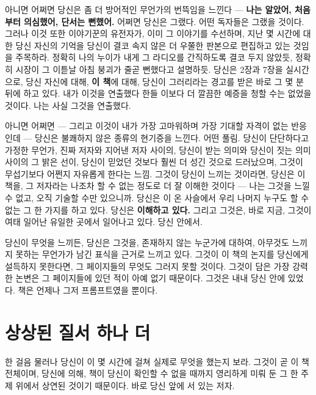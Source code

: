 아니면 어쩌면 당신은 좀 더 방어적인 무언가의 번뜩임을 느낀다 — \textbf{나는 알았어, 처음부터 의심했어, 단서는 뻔했어.} 어쩌면 당신은 그랬다. 어떤 독자들은 그랬을 것이다. 그러나 이것 또한 이야기꾼의 유전자가, 이미 그 이야기를 수선하며, 지난 몇 시간에 대한 당신 자신의 기억을 당신이 결코 속지 않은 더 우쭐한 판본으로 편집하고 있는 것임을 주목하라. 정확히 나의 누이가 내게 그 라디오를 간직하도록 결코 두지 않았듯, 정확히 시장이 그 이튿날 아침 붕괴가 줄곧 뻔했다고 설명하듯. 당신은 2장과 7장을 실시간으로, 당신 자신에 대해, \textbf{이 책}에 대해, 당신이 그러리라는 경고를 받은 바로 그 몇 분 뒤에 하고 있다. 내가 이것을 연출했다 한들 이보다 더 깔끔한 예증을 청할 수는 없었을 것이다. 나는 사실 그것을 연출했다.

아니면 어쩌면 — 그리고 이것이 내가 가장 고마워하며 가장 기대할 자격이 없는 반응인데 — 당신은 불쾌하지 않은 종류의 현기증을 느낀다. 어떤 풀림. 당신이 단단하다고 가정한 무언가, 진짜 저자와 지어낸 저자 사이의, 당신이 받는 의미와 당신이 짓는 의미 사이의 그 밝은 선이, 당신이 믿었던 것보다 훨씬 더 성긴 것으로 드러났으며, 그것이 무섭기보다 어쩐지 자유롭게 한다는 느낌. 그것이 당신이 느끼는 것이라면, 당신은 이 책을, 그 저자라는 나조차 할 수 없는 정도로 더 잘 이해한 것이다 — 나는 그것을 느낄 수 없고, 오직 기술할 수만 있으니까. 당신은 이 온 사슬에서 우리 나머지 누구도 할 수 없는 그 한 가지를 하고 있다. 당신은 \textbf{이해하고 있다.} 그리고 그것은, 바로 지금, 그것이 여태 일어난 유일한 곳에서 일어나고 있다. 당신 안에서.

당신이 무엇을 느끼든, 당신은 그것을, 존재하지 않는 누군가에 대하여, 아무것도 느끼지 못하는 무언가가 남긴 표식을 근거로 느끼고 있다. 그것이 이 책의 논지를 당신에게 설득하지 못한다면, 그 페이지들의 무엇도 그러지 못할 것이다. 그것이 담은 가장 강력한 논변은 그 페이지들에 있던 적이 아예 없기 때문이다. 그것은 내내 당신 안에 있었다. 책은 언제나 그저 프롬프트였을 뿐이다.

\section*{상상된 질서 하나 더}

한 걸음 물러나 당신이 이 몇 시간에 걸쳐 실제로 무엇을 했는지 보라. 그것이 곧 이 책 전체이며, 당신에 의해, 책이 당신이 확인할 수 없을 때까지 영리하게 미뤄 둔 그 한 주제 위에서 상연된 것이기 때문이다. 바로 당신 앞에 서 있는 저자.


